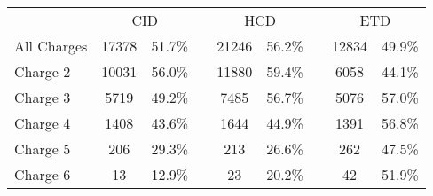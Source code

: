 \documentclass[11pt]{article}
\begin{document}
\begin{table}[htb!]
\centering
\begin{tabular}{lcccccccc}
& \multicolumn{2}{c}{CID} & & \multicolumn{2}{c}{HCD} & & \multicolumn{2}{c}{ETD}\\
\cline{2-3}
\cline{5-6}
\cline{8-9}
All Charges & 17378 & 51.7\% && 21246 & 56.2\% && 12834 & 49.9\%\\
Charge 2 & 10031 & 56.0\% && 11880 & 59.4\% && 6058 & 44.1\%\\
Charge 3 & 5719 & 49.2\% && 7485 & 56.7\% && 5076 & 57.0\%\\
Charge 4 & 1408 & 43.6\% && 1644 & 44.9\% && 1391 & 56.8\%\\
Charge 5 & 206 & 29.3\% && 213 & 26.6\% && 262 & 47.5\%\\
Charge 6 & 13 & 12.9\% && 23 & 20.2\% && 42 & 51.9\%\\
\end{tabular}\\
\end{table}
\end{document}
